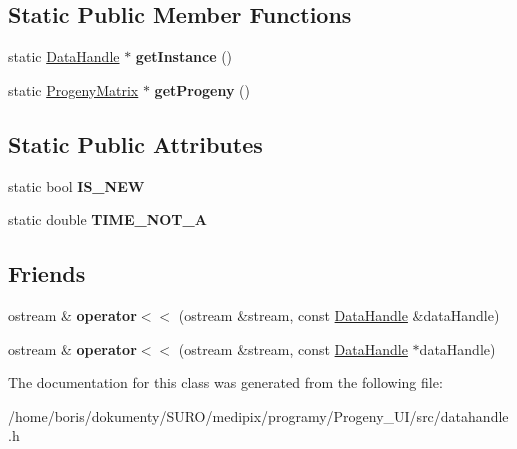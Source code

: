\subsection*{Static Public Member Functions}
\begin{DoxyCompactItemize}
\item 
\hypertarget{classDataHandle_ace9a04d469e246e810d0953801eed10c}{static \hyperlink{classDataHandle}{Data\+Handle} $\ast$ {\bfseries get\+Instance} ()}\label{classDataHandle_ace9a04d469e246e810d0953801eed10c}

\item 
\hypertarget{classDataHandle_af80a0527d802f1fe54089d5f295f05e1}{static \hyperlink{classProgenyMatrix}{Progeny\+Matrix} $\ast$ {\bfseries get\+Progeny} ()}\label{classDataHandle_af80a0527d802f1fe54089d5f295f05e1}

\end{DoxyCompactItemize}
\subsection*{Static Public Attributes}
\begin{DoxyCompactItemize}
\item 
\hypertarget{classDataHandle_af754b84ee488b481af4f4ada4e7c7a97}{static bool {\bfseries I\+S\+\_\+\+N\+E\+W}}\label{classDataHandle_af754b84ee488b481af4f4ada4e7c7a97}

\item 
\hypertarget{classDataHandle_a3433423156ed53980b7636a2c138c3ec}{static double {\bfseries T\+I\+M\+E\+\_\+\+N\+O\+T\+\_\+\+A}}\label{classDataHandle_a3433423156ed53980b7636a2c138c3ec}

\end{DoxyCompactItemize}
\subsection*{Friends}
\begin{DoxyCompactItemize}
\item 
\hypertarget{classDataHandle_a1e7c71a630f82999e0d0899a03a17f2b}{ostream \& {\bfseries operator$<$$<$} (ostream \&stream, const \hyperlink{classDataHandle}{Data\+Handle} \&data\+Handle)}\label{classDataHandle_a1e7c71a630f82999e0d0899a03a17f2b}

\item 
\hypertarget{classDataHandle_a405632c8edc40837fe270361ea4a7d05}{ostream \& {\bfseries operator$<$$<$} (ostream \&stream, const \hyperlink{classDataHandle}{Data\+Handle} $\ast$data\+Handle)}\label{classDataHandle_a405632c8edc40837fe270361ea4a7d05}

\end{DoxyCompactItemize}


The documentation for this class was generated from the following file\+:\begin{DoxyCompactItemize}
\item 
/home/boris/dokumenty/\+S\+U\+R\+O/medipix/programy/\+Progeny\+\_\+\+U\+I/src/datahandle.\+h\end{DoxyCompactItemize}
